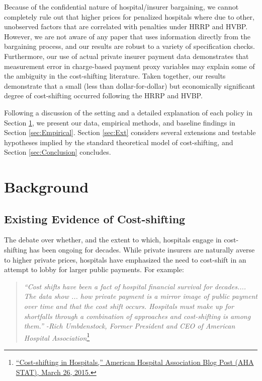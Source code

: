 \documentclass[12pt]{article}
\begin{document}
Because of the confidential nature of hospital/insurer bargaining, we cannot completely rule out that higher prices for penalized hospitals where due to other, unobserved factors that are correlated with penalties under HRRP and HVBP. However, we are not aware of any paper that uses information directly from the bargaining process, and our results are robust to a variety of specification checks.  Furthermore, our use of actual private insurer payment data demonstrates that measurement error in charge-based payment proxy variables may explain some of the ambiguity in the cost-shifting literature. Taken together, our results demonstrate that a small (less than dollar-for-dollar) but economically significant degree of cost-shifting occurred following the HRRP and HVBP.

Following a discussion of the setting and a detailed explanation of each policy in Section \ref{sec:Background}, we present our data, empirical methods, and baseline findings in Section \ref{sec:Empirical}. Section \ref{sec:Ext} considers several extensions and testable hypotheses implied by the standard theoretical model of cost-shifting, and Section \ref{sec:Conclusion} concludes.

\section{Background}
\label{sec:Background}

\subsection{Existing Evidence of Cost-shifting}
The debate over whether, and the extent to which, hospitals engage in cost-shifting has been ongoing for decades. While private insurers are naturally averse to higher private prices, hospitals have emphasized the need to cost-shift in an attempt to lobby for larger public payments. For example:
\begin{quote}
\textit{``Cost shifts have been a fact of hospital financial survival for decades.... The data show ...  how private payment is a mirror image of public payment over time and that the cost shift occurs. Hospitals must make up for shortfalls through a combination of approaches and cost-shifting is among them.'' -Rich Umbdenstock, Former President and CEO of American Hospital Association}\footnote{\href{http://blog.aha.org/post/costshifting-in-hospitals-}{``Cost-shifting in Hospitals,'' American Hospital Association Blog Post (AHA STAT), March 26, 2015.}}
\end{quote}
\end{document}
